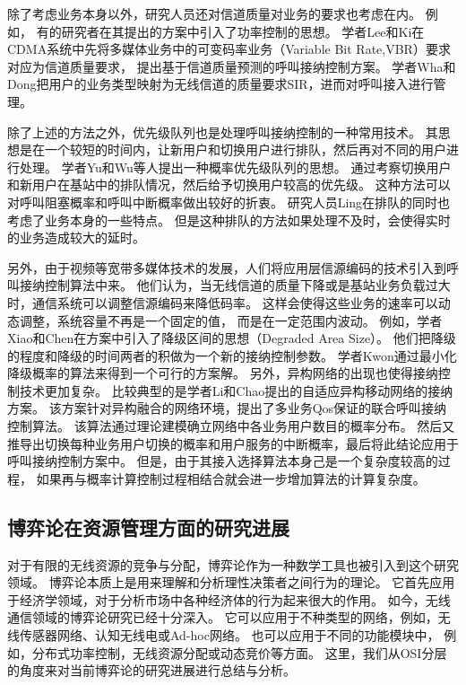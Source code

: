 除了考虑业务本身以外，研究人员还对信道质量对业务的要求也考虑在内。 例如，
有的研究者在其提出的方案中引入了功率控制的思想\cite{LiuZhang:2002}\cite{ZhangFang:2006}。
学者Lee和Ki在CDMA系统中先将多媒体业务中的可变码率业务（Variable Bit Rate,VBR）要求对应为信道质量要求，
提出基于信道质量预测的呼叫接纳控制方案\cite{Lee:2004}。
学者Wha和Dong把用户的业务类型映射为无线信道的质量要求SIR，进而对呼叫接入进行管理\cite{JeonJeong:2001}\cite{Wha:2002}。

除了上述的方法之外，优先级队列也是处理呼叫接纳控制的一种常用技术。
其思想是在一个较短的时间内，让新用户和切换用户进行排队，然后再对不同的用户进行处理。
学者Yu和Wu等人提出一种概率优先级队列的思想。
通过考察切换用户和新用户在基站中的排队情况，然后给予切换用户较高的优先级。
这种方法可以对呼叫阻塞概率和呼叫中断概率做出较好的折衷\cite{Yu:2006}。
研究人员Ling在排队的同时也考虑了业务本身的一些特点\cite{Ling:2009}。
但是这种排队的方法如果处理不及时，会使得实时的业务造成较大的延时。


另外，由于视频等宽带多媒体技术的发展，人们将应用层信源编码的技术引入到呼叫接纳控制算法中来。
他们认为，当无线信道的质量下降或是基站业务负载过大时，通信系统可以调整信源编码来降低码率。
这样会使得这些业务的速率可以动态调整，系统容量不再是一个固定的值，
而是在一定范围内波动。
例如，学者Xiao和Chen在方案中引入了降级区间的思想（Degraded Area Size）\cite{XiaoChen:2000}。
他们把降级的程度和降级的时间两者的积做为一个新的接纳控制参数。
学者Kwon通过最小化降级概率的算法来得到一个可行的方案解\cite{KwonChoi:1999}。
另外，异构网络的出现也使得接纳控制技术更加复杂。
比较典型的是学者Li和Chao提出的自适应异构移动网络的接纳方案\cite{LiChao:2007}。
该方案针对异构融合的网络环境，提出了多业务Qos保证的联合呼叫接纳控制算法。
该算法通过理论建模确立网络中各业务用户数目的概率分布。
然后又推导出切换每种业务用户切换的概率和用户服务的中断概率，最后将此结论应用于呼叫接纳控制方案中。 
但是，由于其接入选择算法本身己是一个复杂度较高的过程，
如果再与概率计算控制过程相结合就会进一步增加算法的计算复杂度。



\subsection{博弈论在资源管理方面的研究进展}
对于有限的无线资源的竞争与分配，博弈论作为一种数学工具也被引入到这个研究领域。
博弈论本质上是用来理解和分析理性决策者之间行为的理论。
它首先应用于经济学领域，对于分析市场中各种经济体的行为起来很大的作用。
如今，无线通信领域的博弈论研究已经十分深入。
它可以应用于不种类型的网络，例如，无线传感器网络、认知无线电或Ad-hoc网络\cite{MachadoTekinay:2008}\cite{WangWu:2010}\cite{Srivastava:2005}。
也可以应用于不同的功能模块中，
例如，分布式功率控制，无线资源分配或动态竞价等方面\cite{AlpcanBasar:2006}\cite{Senqupta:2009}。
这里，我们从OSI分层的角度来对当前博弈论的研究进展进行总结与分析。

